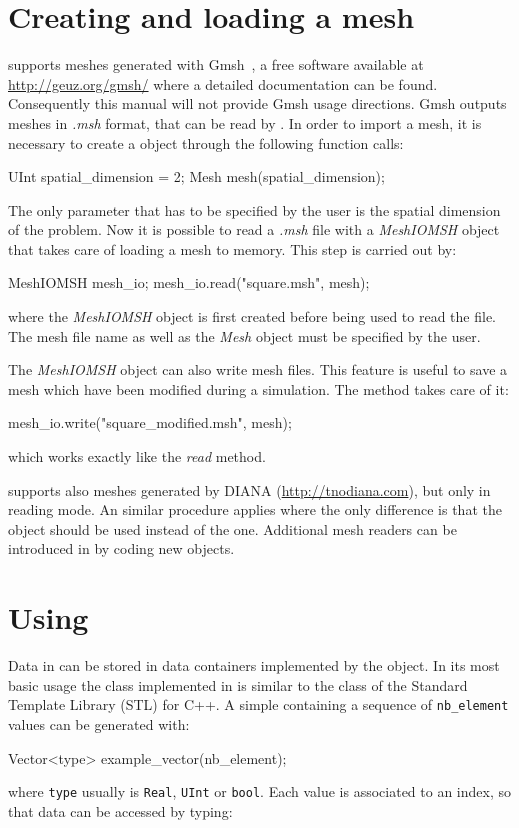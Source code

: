 \section{Creating and loading a mesh\label{sect:common:mesh}}

\akantu supports meshes generated with Gmsh~\cite{gmsh}, a free
software available at \url{http://geuz.org/gmsh/} where a detailed
documentation can be found. Consequently this manual will not provide
Gmsh usage directions. Gmsh outputs meshes in \textit{.msh} format, that can be read
by \akantu. In order to import a mesh, it is necessary to create
a  object through the following function calls:
\begin{cpp}
  UInt spatial_dimension = 2;
  Mesh mesh(spatial_dimension);
\end{cpp}
The only parameter that has to be specified by the user is the spatial
dimension of the problem. Now it is possible to read a \textit{.msh} file with
a \textit{MeshIOMSH} object that takes care of loading a mesh to memory.
This step is carried out by:
\begin{cpp}
  MeshIOMSH mesh_io;
  mesh_io.read("square.msh", mesh);
\end{cpp}
where the \textit{MeshIOMSH} object is first created before being
used to read the  file. The mesh file name as well as the \textit{Mesh}
object must be specified by the user.

The \textit{MeshIOMSH} object can also write mesh files. This
feature is useful to save a mesh which have been modified during a
simulation. The  method takes care of it:
\begin{cpp}
  mesh_io.write("square_modified.msh", mesh);
\end{cpp}
which works exactly like the \textit{read} method.

\akantu supports also meshes generated by
DIANA (\url{http://tnodiana.com}), but only in reading mode. An similar
procedure applies where the only
difference is that the  object should be used
instead of the  one. Additional mesh readers can be
introduced in \akantu by coding new  objects.

\section{Using }

Data in \akantu can be stored in data containers implemented by
the  object. In its most basic usage the  class
implemented in \akantu is similar to the  class of
the Standard Template Library (STL) for C++. A simple 
containing a sequence of \texttt{nb\_element} values can be generated with:
\begin{cpp}
  Vector<type> example_vector(nb_element);
\end{cpp}
where \texttt{type} usually is \texttt{Real}, \texttt{UInt} or
\texttt{bool}. Each value is associated to an index, so that data can be
accessed by typing:

